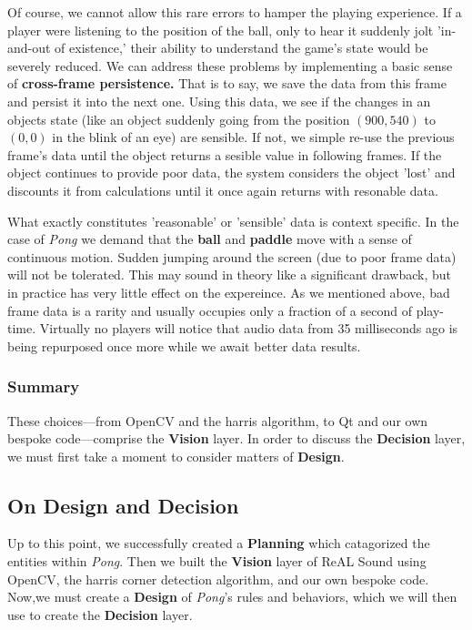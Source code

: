 \documentclass{report}
\newcommand{\rs}{ReAL Sound\xspace}
\newcommand{\plan}{\textbf{Planning}\xspace}
\newcommand{\design}{\textbf{Design}\xspace}
\newcommand{\vision}{\textbf{Vision}\xspace}
\newcommand{\decision}{\textbf{Decision}\xspace}
\newcommand{\pad}{\textbf{paddle}\xspace}
\newcommand{\ball}{\textbf{ball}\xspace}
\newcommand{\tech}[1]{\textbf{#1}}
\begin{document}
Of course, we cannot allow this rare errors to hamper the playing experience. If a player were listening to the position of the ball, only to hear it suddenly jolt 'in-and-out of existence,' their ability to understand the game's state would be severely reduced. We can address these problems by implementing a basic sense of \tech{cross-frame persistence.} That is to say, we save the data from this frame and persist it into the next one. Using this data, we see if the changes in an objects state (like an object suddenly going from the position $(900, 540)$ to $(0, 0)$ in the blink of an eye) are sensible. If not, we simple re-use the previous frame's data until the object returns a sesible value in following frames. If the object continues to provide poor data, the system considers the object 'lost' and discounts it from calculations until it once again returns with resonable data. 

What exactly constitutes 'reasonable' or 'sensible' data is context specific. In the case of \emph{Pong} we demand that the \ball and \pad move with a sense of continuous motion. Sudden jumping around the screen (due to poor frame data) will not be tolerated. This may sound in theory like a significant drawback, but in practice has very little effect on the expereince. As we mentioned above, bad frame data is a rarity and usually occupies only a fraction of a second of play-time. Virtually no players will notice that audio data from 35 milliseconds ago is being repurposed once more while we await better data results. 

\subsubsection{Summary}
These choices---from OpenCV and the harris algorithm, to Qt and our own bespoke code---comprise the \vision layer. In order to discuss the \decision layer, we must first take a moment to consider matters of \design.

\subsection{On Design and Decision}
Up to this point, we successfully created a \plan which catagorized the entities within \emph{Pong}. Then we built the \vision layer of \rs using OpenCV, the harris corner detection algorithm, and our own bespoke code. Now,we must create a \design of \emph{Pong}'s rules and behaviors, which we will then use to create the \decision layer. 
\end{document}
